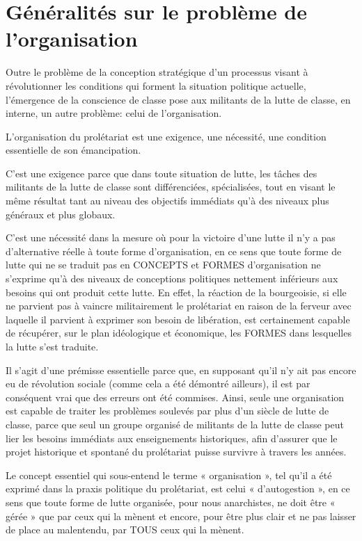 \chapter{Généralités sur le problème de l'organisation}

Outre le problème de la conception stratégique d'un processus visant à révolutionner les conditions qui forment la situation politique actuelle, l'émergence de la conscience de classe pose aux militants de la lutte de classe, en interne, un autre problème: celui de l'organisation.

L'organisation du prolétariat est une exigence, une nécessité, une condition essentielle de son émancipation.

C'est une exigence parce que dans toute situation de lutte, les tâches des militants de la lutte de classe sont différenciées, spécialisées, tout en visant le même résultat tant au niveau des objectifs immédiats qu'à des niveaux plus généraux et plus globaux.

C'est une nécessité dans la mesure où pour la victoire d'une lutte il n'y a pas d'alternative réelle à toute forme d'organisation, en ce sens que toute forme de lutte qui ne se traduit pas en CONCEPTS et FORMES d'organisation ne s'exprime qu'à des niveaux de conceptions politiques nettement inférieurs aux besoins qui ont produit cette lutte. En effet, la réaction de la bourgeoisie, si elle ne parvient pas à vaincre militairement le prolétariat en raison de la ferveur avec laquelle il parvient à exprimer son besoin de libération, est certainement capable de récupérer, sur le plan idéologique et économique, les FORMES dans lesquelles la lutte s'est traduite.

Il s'agit d'une prémisse essentielle parce que, en supposant qu'il n'y ait pas encore eu de révolution sociale (comme cela a été démontré ailleurs), il est par conséquent vrai que des erreurs ont été commises. Ainsi, seule une organisation est capable de traiter les problèmes soulevés par plus d'un siècle de lutte de classe, parce que seul un groupe organisé de militants de la lutte de classe peut lier les besoins immédiats aux enseignements historiques, afin d'assurer que le projet historique et spontané du prolétariat puisse survivre à travers les années.

Le concept essentiel qui sous-entend le terme « organisation », tel qu'il a été exprimé dans la praxis politique du prolétariat, est celui « d'autogestion », en ce sens que toute forme de lutte organisée, pour nous anarchistes, ne doit être « gérée » que par ceux qui la mènent et encore, pour être plus clair et ne pas laisser de place au malentendu, par TOUS ceux qui la mènent.

